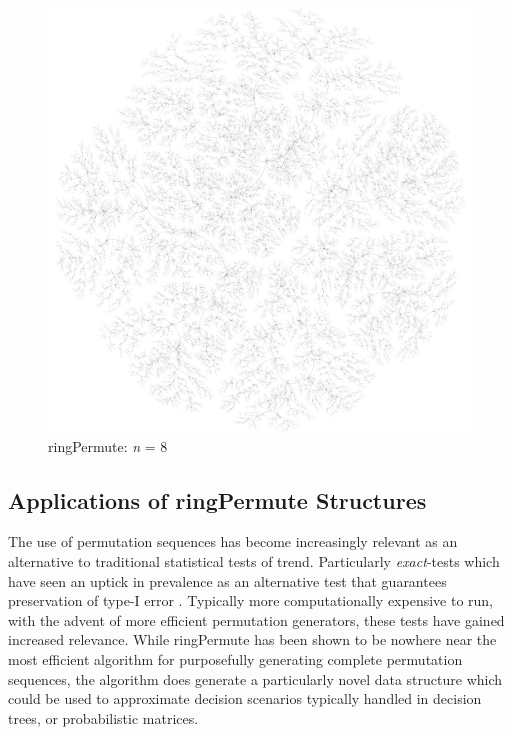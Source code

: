 \documentclass[12pt]{article}
\begin{document}
\begin{figure}[ht]
\hspace{0.5cm}
\centering
\includegraphics[scale=0.25]{Graphs/8-permute.png}
\caption{ringPermute: \emph{n} = 8}
\label{ringPermute-8}
\end{figure}
\pagebreak[4]

\subsection{Applications of ringPermute Structures}
The use of permutation sequences has become increasingly relevant as an alternative to traditional statistical tests of trend.
Particularly \emph{exact}-tests which have seen an uptick in prevalence as an alternative test that guarantees preservation of type-I error \cite{Corcoran_Mehta_2001}.
Typically more computationally expensive to run, with the advent of more efficient permutation generators, these tests have gained increased relevance. While ringPermute has been shown to be nowhere near the most efficient algorithm for purposefully generating complete permutation sequences, the algorithm does generate a particularly novel data structure which could be used to approximate decision scenarios typically handled in decision trees, or probabilistic matrices. \\
\end{document}
